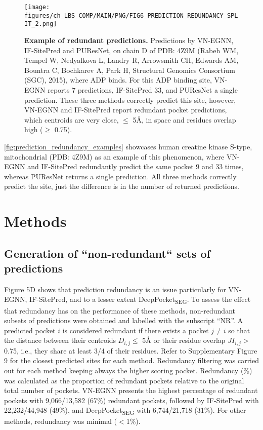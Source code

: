 \begin{figure}[htb!]
    \centering
    \texttt{[image: figures/ch\_LBS\_COMP/MAIN/PNG/FIG6\_PREDICTION\_REDUNDANCY\_SPLIT\_2.png]}
    \caption[Example of redundant predictions]{\textbf{Example of redundant predictions.} Predictions by VN-EGNN, IF-SitePred and PUResNet, on chain D of PDB: 4Z9M (Rabeh WM, Tempel W, Nedyalkova L, Landry R, Arrowsmith CH, Edwards AM, Bountra C, Bochkarev A, Park H, Structural Genomics Consortium (SGC), 2015), where ADP binds. For this ADP binding site, VN-EGNN reports 7 predictions, IF-SitePred 33, and PUResNet a single prediction. These three methods correctly predict this site, however, VN-EGNN and IF-SitePred report redundant pocket predictions, which centroids are very close, $\leq$ 5\AA{}, in space and residues overlap high ($\geq$ 0.75).}
    \label{fig:prediction_redundancy_examples}
\end{figure}

\autoref{fig:prediction_redundancy_examples} showcases human creatine kinase S-type, mitochondrial (PDB: 4Z9M) as an example of this phenomenon, where VN-EGNN and IF-SitePred redundantly predict the same pocket 9 and 33 times, whereas PUResNet returns a single prediction. All three methods correctly predict the site, just the difference is in the number of returned predictions.

\section{Methods}

\subsection{Generation of ``non-redundant`` sets of predictions}

Figure 5D shows that prediction redundancy is an issue particularly for VN-EGNN, IF-SitePred, and to a lesser extent DeepPocket\textsubscript{SEG}. To assess the effect that redundancy has on the performance of these methods, non-redundant subsets of predictions were obtained and labelled with the subscript ``NR''. A predicted pocket $i$ is considered redundant if there exists a pocket $j \neq i$ so that the distance between their centroids $D_{i,j} \leq$ 5\AA{} or their residue overlap $JI_{i,j} >$ 0.75, i.e., they share at least 3/4 of their residues. Refer to Supplementary Figure 9 for the closest predicted sites for each method. Redundancy filtering was carried out for each method keeping always the higher scoring pocket. Redundancy (\%) was calculated as the proportion of redundant pockets relative to the original total number of pockets. VN-EGNN presents the highest percentage of redundant pockets with 9,066/13,582 (67\%) redundant pockets, followed by IF-SitePred with 22,232/44,948 (49\%), and DeepPocket\textsubscript{SEG} with 6,744/21,718 (31\%). For other methods, redundancy was minimal ($<$1\%).

